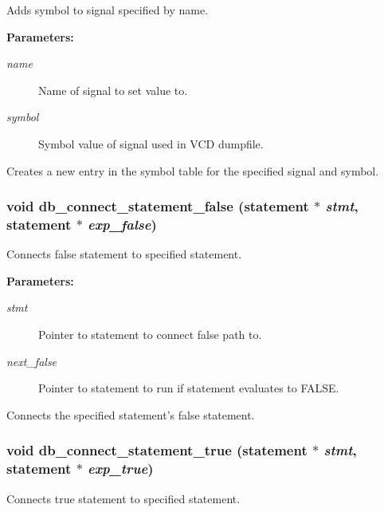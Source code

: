 Adds symbol to signal specified by name.

\begin{Desc}
\item[{\bf Parameters: }]\par
\begin{description}
\item[
{\em name}]Name of signal to set value to. \item[
{\em symbol}]Symbol value of signal used in VCD dumpfile.

\end{description}
\end{Desc}
Creates a new entry in the symbol table for the specified signal and symbol. 
\subsubsection{\setlength{\rightskip}{0pt plus 5cm}void db\_\-connect\_\-statement\_\-false ({\bf statement} $\ast$ {\em stmt}, {\bf statement} $\ast$ {\em exp\_\-false})}\label{db_8h_a19}


Connects false statement to specified statement.

\begin{Desc}
\item[{\bf Parameters: }]\par
\begin{description}
\item[
{\em stmt}]Pointer to statement to connect false path to. \item[
{\em next\_\-false}]Pointer to statement to run if statement evaluates to FALSE.

\end{description}
\end{Desc}
Connects the specified statement's false statement. 
\subsubsection{\setlength{\rightskip}{0pt plus 5cm}void db\_\-connect\_\-statement\_\-true ({\bf statement} $\ast$ {\em stmt}, {\bf statement} $\ast$ {\em exp\_\-true})}\label{db_8h_a18}


Connects true statement to specified statement.

